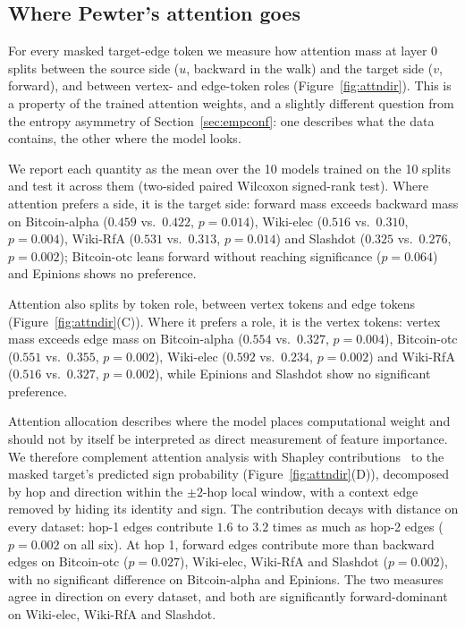\documentclass[sigconf]{acmart}
\theoremstyle{plain}
\theoremstyle{definition}
\begin{document}
\subsection{Where Pewter's attention goes}
For every masked target-edge token we measure how attention mass at layer 0 splits between the source side ($u$, backward in the walk) and the target side ($v$, forward), and between vertex- and edge-token roles (Figure~\ref{fig:attndir}). This is a property of the trained attention weights, and a slightly different question from the entropy asymmetry of Section~\ref{sec:empconf}: one describes what the data contains, the other where the model looks. 

We report each quantity as the mean over the 10 models trained on the 10 splits and test it across them (two-sided paired Wilcoxon signed-rank test). Where attention prefers a side, it is the target side: forward mass exceeds backward mass on Bitcoin-alpha ($0.459$ vs.\ $0.422$, $p=0.014$), Wiki-elec ($0.516$ vs.\ $0.310$, $p=0.004$), Wiki-RfA ($0.531$ vs.\ $0.313$, $p=0.014$) and Slashdot ($0.325$ vs.\ $0.276$, $p=0.002$); Bitcoin-otc leans forward without reaching significance ($p=0.064$) and Epinions shows no preference. 

Attention also splits by token role, between vertex tokens and edge tokens (Figure~\ref{fig:attndir}(C)). Where it prefers a role, it is the vertex tokens: vertex mass exceeds edge mass on Bitcoin-alpha ($0.554$ vs.\ $0.327$, $p=0.004$), Bitcoin-otc ($0.551$ vs.\ $0.355$, $p=0.002$), Wiki-elec ($0.592$ vs.\ $0.234$, $p=0.002$) and Wiki-RfA ($0.516$ vs.\ $0.327$, $p=0.002$), while Epinions and Slashdot show no significant preference.

Attention allocation describes where the model places computational weight and should not by itself be interpreted as direct measurement of feature importance. We therefore complement attention analysis with Shapley contributions~\citep{shapley1953value} to the masked target's predicted sign probability (Figure~\ref{fig:attndir}(D)), decomposed by hop and direction within the $\pm2$-hop local window, with a context edge removed by hiding its identity and sign. The contribution decays with distance on every dataset: hop-1 edges contribute $1.6$ to $3.2$ times as much as hop-2 edges ($p=0.002$ on all six). At hop 1, forward edges contribute more than backward edges on Bitcoin-otc ($p=0.027$), Wiki-elec, Wiki-RfA and Slashdot ($p=0.002$), with no significant difference on Bitcoin-alpha and Epinions. The two measures agree in direction on every dataset, and both are significantly forward-dominant on Wiki-elec, Wiki-RfA and Slashdot.
\end{document}
